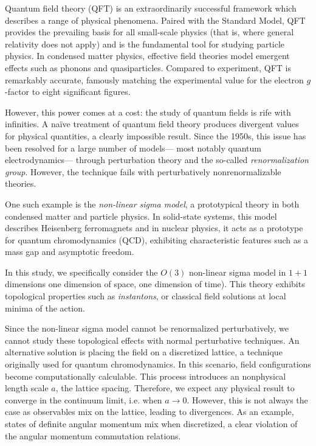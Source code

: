Quantum field theory (QFT) is an extraordinarily successful framework which describes a range of physical phenomena. Paired with the Standard Model, QFT provides the prevailing basis for all small-scale physics (that is, where general relativity does not apply) and is the fundamental tool for studying particle physics. In condensed matter physics, effective field theories model emergent effects such as phonons and quasiparticles. Compared to experiment, QFT is remarkably accurate, famously matching the experimental value for the electron $g$-factor to eight significant figures.\cite{weisskopf1981} 

However, this power comes at a cost: the study of quantum fields is rife with infinities. A na\"ive treatment of quantum field theory produces divergent values for physical quantities, a clearly impossible result. Since the 1950s, this issue has been resolved for a large number of models--- most notably quantum electrodynamics--- through perturbation theory and the so-called \textit{renormalization group}. However, the technique fails with perturbatively nonrenormalizable theories. 

One such example is the \textit{non-linear sigma model}, a prototypical theory in both condensed matter and particle physics. In solid-state systems, this model describes Heisenberg ferromagnets and in nuclear physics, it acts as a prototype for quantum chromodynamics (QCD), exhibiting characteristic features such as a mass gap and asymptotic freedom. \citeneeded

In this study, we specifically consider the $O(3)$ non-linear sigma model in $1+1$ dimensions one dimension of space, one dimension of time). This theory exhibits topological properties such as \textit{instantons}, or classical field solutions at local minima of the action.



Since the non-linear sigma model cannot be renormalized perturbatively, we cannot study these topological effects with normal perturbative techniques. An alternative solution is placing the field on a discretized lattice, a technique originally used for quantum chromodynamics. In this scenario, field configurations become computationally calculable. This process introduces an nonphysical length scale $a$, the lattice spacing. Therefore, we expect any physical result to converge in the continuum limit, i.e. when $a\rightarrow 0$. However, this is not always the case as observables mix on the lattice, leading to divergences. As an example, states of definite angular momentum mix when discretized, a clear violation of the angular momentum commutation relations. 


